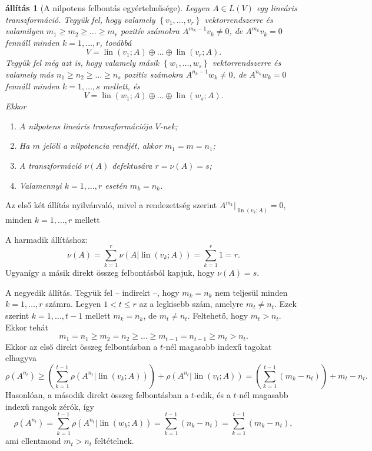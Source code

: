 \documentclass[9pt, a4paper, showtrims]{memoir}
\makeatletter
\renewenvironment{proof}[1][\proofname]
    {\par\pushQED{\qed}%
    \normalfont \topsep6\p@\@plus6\p@\relax
    \trivlist
    \item[\hskip\labelsep
        \itshape
    #1\@addpunct{:}]\ignorespaces}
    {\popQED\endtrivlist\@endpefalse}
\theoremstyle{plain}
\newtheorem{proposition}{állítás}[chapter]
\theoremstyle{remark}
\theoremstyle{definition}
\DeclareMathOperator{\lin}{lin}
\makeatother
\begin{document}
\begin{proposition}[A nilpotens felbontás egyértelműsége]
	Legyen $A\in L\left( V \right)$ egy lineáris transzformáció.
	Tegyük fel, hogy valamely $\left\{ v_1,\ldots,v_r \right\}$ vektorrendszerre és valamilyen
	$m_1\geq m_2\geq \dots\geq m_r$ pozitív számokra
	$A^{m_k-1}v_k\neq 0$, de $A^{m_k}v_k=0$ fennáll minden $k=1,\ldots,r$, továbbá
	\[
		V=\lin(v_1;A)\oplus \dots \oplus\lin(v_r;A).
	\]
	Tegyük fel még azt is,
	hogy valamely másik $\left\{ w_1,\ldots,w_s \right\}$ vektorrendszerre és valamely más
	$n_1\geq n_2\geq \dots\geq n_s$ pozitív számokra
	$A^{n_k-1}w_k\neq 0$, de $A^{n_k}w_k=0$ fennáll minden $k=1,\ldots,s$ mellett, és
	\[
		V=\lin(w_1;A)\oplus \dots \oplus\lin(w_s;A).
	\]
	Ekkor
	\begin{enumerate}
		\item $A$ nilpotens lineáris transzformációja $V$-nek;
		\item Ha $m$ jelöli a nilpotencia rendjét, akkor
		      \(
		      m_1=m=n_1
		      \);
		\item A transzformáció $\nu\left( A \right)$ defektusára
		      \(
		      r=\nu\left( A \right)=s
		      \);
		\item Valamennyi $k=1,\ldots,r$ esetén
		      \(
		      m_k=n_k
		      \).\qedhere
	\end{enumerate}
\end{proposition}
\begin{proof}
	Az első két állítás nyilvánvaló, mivel a rendezettség szerint
    $A^{m_1}|_{\lin(v_k;A)}=0$,
	minden $k=1,\ldots,r$ mellett

	A harmadik állításhoz:
	\[
		\nu\left( A \right)=\sum_{k=1}^r\nu\left( A|\lin(v_k;A) \right)=
		\sum_{k=1}^r1=r.
	\]
	Ugyanígy a másik direkt összeg felbontásból kapjuk, hogy $\nu\left( A \right)=s$.

	A negyedik állítás.
	Tegyük fel -- indirekt --, hogy $m_k=n_k$ nem teljesül minden $k=1,\ldots,r$ számra.
	Legyen $1<t\leq r$ az a legkisebb szám, amelyre $m_t\neq n_t$.
	Ezek szerint $k=1,\ldots,t-1$ mellett $m_k=n_k$, de $m_t\neq n_t$.
	Feltehető, hogy $m_t>n_t$.
	Ekkor tehát
	\[
		m_1=n_1\geq m_2=n_2\geq\dots\geq m_{t-1}=n_{t-1}\geq m_t>n_t.
	\]
	Ekkor az első direkt összeg felbontásban a $t$-nél magasabb indexű tagokat elhagyva
	\[
		\rho\left( A^{n_t} \right)
		\geq
		\left( \sum_{k=1}^{t-1}\rho\left( A^{n_t}|\lin(v_k;A) \right) \right)
		+\rho\left( A^{n_t}|\lin(v_t;A) \right)
		=
		\left( \sum_{k=1}^{t-1}(m_k-n_t) \right)+m_t-n_t.
	\]
	Hasonlóan, a második direkt összeg felbontásban a $t$-edik, és a $t$-nél magasabb indexű rangok zérók, így
	\[
		\rho\left( A^{n_t} \right)
		=
		\sum_{k=1}^{t-1}\rho\left( A^{n_t}|\lin(w_k;A) \right)
		=
		\sum_{k=1}^{t-1}(n_k-n_t)
		=
		\sum_{k=1}^{t-1}(m_k-n_t),
	\]
	ami ellentmond $m_t>n_t$ feltételnek.
\end{proof}
\end{document}
